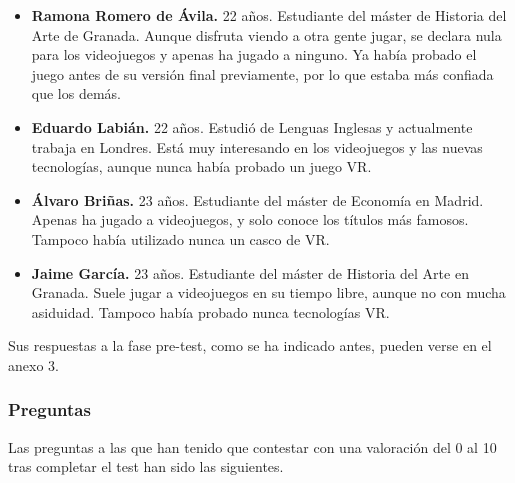 \begin{itemize}
    \item \textbf{Ramona Romero de Ávila.} 22 años. Estudiante del máster de Historia del Arte de Granada. Aunque disfruta viendo a otra gente jugar, se declara nula para los videojuegos y apenas ha jugado a ninguno. Ya había probado el juego antes de su versión final previamente, por lo que estaba más confiada que los demás.
    
    \item \textbf{Eduardo Labián.} 22 años. Estudió de Lenguas Inglesas y actualmente trabaja en Londres. Está muy interesando en los videojuegos y las nuevas tecnologías, aunque nunca había probado un juego \acs{VR}.
    
    \item \textbf{Álvaro Briñas.} 23 años. Estudiante del máster de Economía en Madrid. Apenas ha jugado a videojuegos, y solo conoce los títulos más famosos. Tampoco había utilizado nunca un casco de \acs{VR}.
    
    \item \textbf{Jaime García.} 23 años. Estudiante del máster de Historia del Arte en Granada. Suele jugar a videojuegos en su tiempo libre, aunque no con mucha asiduidad. Tampoco había probado nunca tecnologías VR.
    
\end{itemize}

Sus respuestas a la fase pre-test, como se ha indicado antes, pueden verse en el anexo 3.

\subsubsection{Preguntas}

Las preguntas a las que han tenido que contestar con una valoración del 0 al 10 tras completar el test han sido las siguientes. 

